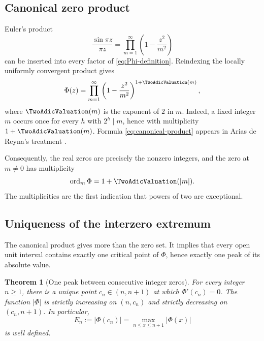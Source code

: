 \documentclass[11pt,oneside]{article}
\newtheorem{theorem}{Theorem}[section]
\theoremstyle{definition}
\theoremstyle{remark}
\newcommand{\PhiF}{\Phi}
\begin{document}
\subsection{Canonical zero product}

Euler's product
\[
 \frac{\sin\pi z}{\pi z}
 =\prod_{m=1}^{\infty}\left(1-\frac{z^2}{m^2}\right)
\]
can be inserted into every factor of \eqref{eq:Phi-definition}.  Reindexing
the locally uniformly convergent product gives
\begin{equation}
 \PhiF(z)=
 \prod_{m=1}^{\infty}
 \left(1-\frac{z^2}{m^2}\right)^{1+\TwoAdicValuation(m)},
 \label{eq:canonical-product}
\end{equation}
where \(\TwoAdicValuation(m)\) is the exponent of \(2\) in \(m\).  Indeed, a fixed
integer \(m\) occurs once for every \(h\) with \(2^h\mid m\), hence with
multiplicity \(1+\TwoAdicValuation(m)\).  Formula \eqref{eq:canonical-product} appears in
Arias de Reyna's treatment \cite{arias2017}.

Consequently, the real zeros are precisely the nonzero integers, and the zero
at \(m\ne0\) has multiplicity
\begin{equation}
 \operatorname{ord}_{m}\PhiF=1+\TwoAdicValuation(|m|).
 \label{eq:zero-multiplicity}
\end{equation}
The multiplicities are the first indication that powers of two are exceptional.

\subsection{Uniqueness of the interzero extremum}

The canonical product gives more than the zero set.  It implies that every
open unit interval contains exactly one critical point of \(\PhiF\), hence
exactly one peak of its absolute value.

\begin{theorem}[One peak between consecutive integer zeros]
\label{thm:unique-peak}
For every integer \(n\ge1\), there is a unique point
\(c_n\in(n,n+1)\) at which \(\PhiF'(c_n)=0\).  The function
\(|\PhiF|\) is strictly increasing on \((n,c_n)\) and strictly decreasing on
\((c_n,n+1)\).  In particular,
\[
 E_n:=|\PhiF(c_n)|
 =\max_{n\le x\le n+1}|\PhiF(x)|
\]
is well defined.
\end{theorem}
\end{document}
